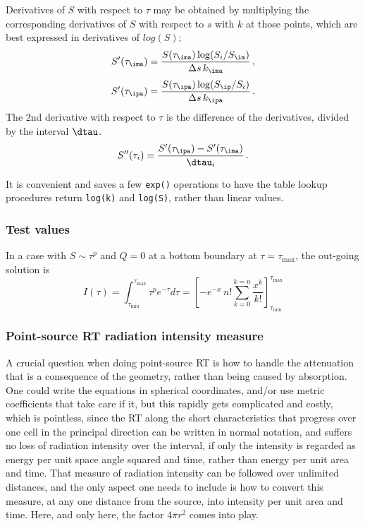 \documentclass[paper=a4,fontsize=11pt]{scrartcl}
\numberwithin{equation}{section}		%
\numberwithin{figure}{section}			%
\numberwithin{table}{section}				%
\begin{document}
Derivatives of $S$ with respect to $\tau$ may be obtained by multiplying the corresponding derivatives of $S$ with respect to $s$ with $k$ at those points, which are best expressed in derivatives of $log(S)$;
\begin{equation}
    S'(\tau_\ima)=\frac{S(\tau_\ima)\log(S_i/S_\im)}{\Delta s \,k_\ima} \,,
\end{equation}
\begin{equation}
    S'(\tau_\ipa)=\frac{S(\tau_\ipa)\log(S_\ip/S_i)}{\Delta s \,k_\ipa} \,.
\end{equation}
The 2nd derivative with respect to $\tau$ is the difference of the derivatives, divided by the interval $\dtau$.
\begin{equation}
    S''(\tau_i)=\frac{S'(\tau_\ipa)-S'(\tau_\ima)}{\dtau_i} \,.
\end{equation}

It is convenient and saves a few \verb|exp()| operations to have the table lookup procedures return \verb|log(k)| and \verb|log(S)|, rather than linear values.

\subsubsection{Test values}
In a case with $S \sim \tau^p$ and $Q=0$ at a bottom boundary at $\tau=\tau_\mathrm{max}$, the out-going solution is
\begin{equation}
    I(\tau) = \int_{\tau_\mathrm{min}}^{\tau_\mathrm{max}} \tau^p e^{-\tau} d\tau =
    \left[ -e^{-x}\, n!\sum_{k=0}^{k=n} \frac{x^k }{k!}\right]_{\tau_\mathrm{min}}^{\tau_\mathrm{max}}
\end{equation}

\subsubsection{Point-source RT radiation intensity measure}
A crucial question when doing point-source RT is how to handle the attenuation that is a consequence of the geometry, rather than being caused by absorption.   One could write the equations in spherical coordinates, and/or use metric coefficients that take care if it, but this rapidly gets complicated and costly, which is pointless, since the RT along the short characteristics that progress over one cell in the principal direction can be written in normal notation, and suffers no loss of radiation intensity over the interval, if only the intensity is regarded as energy per unit space angle squared and time, rather than energy per unit area and time.  That measure of radiation intensity can be followed over unlimited distances, and the only aspect one needs to include is how to convert this measure, at any one distance from the source, into intensity per unit area and time.  Here, and only here, the factor $4\pi r^2$ comes into play.
\end{document}
